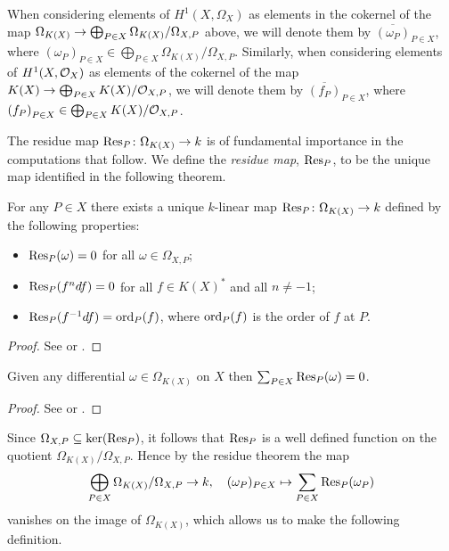     \begin{rem}
        When considering elements of $H^1(X,\Omega_X)$ as elements in the cokernel of the map $\Omega_{K(X)} \rightarrow \bigoplus_{P \in X}\Omega_{K(X)}/\Omega_{X,P}$ above, we will denote them by $\overline{(\omega_P)}_{P \in X}$, where ${(\omega_P)}_{P \in X}\in \bigoplus_{P \in X}\Omega_{K(X)}/\Omega_{X,P}$.
        Similarly, when considering elements of $H^1(X,\mathcal{O}_X)$ as elements of the cokernel of the map $K(X) \rightarrow \bigoplus_{P \in X}K(X)/{\cal O}_{X,P}$, we will denote them by $\overline{(f_P)}_{P \in X}$, where ${(f_P)}_{P \in X} \in \bigoplus_{P \in X}K(X)/{\cal O}_{X,P}$.
    \end{rem}

The residue map $\operatorname{Res}_P \colon \Omega_{K(X)} \rightarrow k$ is of fundamental importance in the computations that follow.
We define the {\em residue map}, $\operatorname{Res}_P$, to be the unique map identified in the following theorem.

    \begin{thm}\label{theoremresiduemap}
    For any $P\in X$ there exists a unique $k$-linear map $\operatorname{Res}_P \colon \Omega_{K(X)} \rightarrow k$ defined by the following properties:
        \begin{itemize}
            \item $\operatorname{Res}_P(\omega) = 0$ for all $\omega \in \Omega_{X,P}$;
            \item $\operatorname{Res}_P(f^ndf) = 0$ for all $f \in K(X)^*$ and all $n \neq -1$;
            \item $\operatorname{Res}_P(f^{-1}df) = \operatorname{ord}_P(f)$, where $\operatorname{ord}_P(f)$ is the order of $f$ at $P$.
        \end{itemize}
    \end{thm}
    \begin{proof}
    See \cite[Chap.\ II, \S 7 and \S 11]{algebraicgroupsandclassfields} or \cite{residuesofdifferentialsoncurve}.
    \end{proof}


    \begin{thm}\label{theoremresiduetheorem}
    Given any differential $\omega \in \Omega_{K(X)}$ on $X$ then $\sum_{P \in X}\operatorname{Res}_P(\omega) = 0$.
    \end{thm}
    \begin{proof}
    See \cite[Chap.\ II, Prop.\ 6]{algebraicgroupsandclassfields} or \cite[Pg.\ 155]{residuesofdifferentialsoncurve}.
    \end{proof}

Since $\Omega_{X,P} \subseteq \ker (\operatorname{Res}_P)$, it follows that $\operatorname{Res}_P$ is a well defined function on the quotient $\Omega_{K(X)}/\Omega_{X,P}$.
Hence by the residue theorem the map
    \begin{equation*} 
    \bigoplus_{P \in X} \Omega_{K(X)}/\Omega_{X,P} \rightarrow k, \quad (\omega_P)_{P \in X} \mapsto \sum_{P\in X} \operatorname{Res}_P(\omega_P)
    \end{equation*} 
vanishes on the image of $\Omega_{K(X)}$, which allows us to make the following definition.
    
